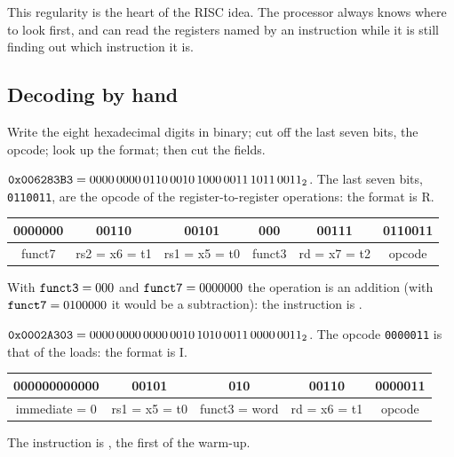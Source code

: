 This regularity is the heart of the RISC idea. The processor always knows
where to look first, and can read the registers named by an instruction while
it is still finding out which instruction it is.

\subsection{Decoding by hand}

\begin{prgconcept}
Write the eight hexadecimal digits in binary; cut off the last seven bits, the
opcode; look up the format; then cut the fields.
\end{prgconcept}

\begin{example}{}
$\texttt{0x006283B3}=0000\,0000\,0110\,0010\,1000\,0011\,1011\,0011_2$. The last
seven bits, \texttt{0110011}, are the opcode of the register-to-register
operations: the format is R.
\begin{center}\small\ttfamily
\begin{tabular}{|c|c|c|c|c|c|}\hline
0000000&00110&00101&000&00111&0110011\\\hline
\multicolumn{1}{c}{\textrm{\scriptsize funct7}}&\multicolumn{1}{c}{\textrm{\scriptsize rs2 = x6 = t1}}&\multicolumn{1}{c}{\textrm{\scriptsize rs1 = x5 = t0}}&\multicolumn{1}{c}{\textrm{\scriptsize funct3}}&\multicolumn{1}{c}{\textrm{\scriptsize rd = x7 = t2}}&\multicolumn{1}{c}{\textrm{\scriptsize opcode}}
\end{tabular}
\end{center}
With $\texttt{funct3}=000$ and $\texttt{funct7}=0000000$ the operation is an
addition (with $\texttt{funct7}=0100000$ it would be a subtraction): the
instruction is .
\end{example}

\begin{example}{}
$\texttt{0x0002A303}=0000\,0000\,0000\,0010\,1010\,0011\,0000\,0011_2$. The opcode
\texttt{0000011} is that of the loads: the format is I.
\begin{center}\small\ttfamily
\begin{tabular}{|c|c|c|c|c|}\hline
000000000000&00101&010&00110&0000011\\\hline
\multicolumn{1}{c}{\textrm{\scriptsize immediate = 0}}&\multicolumn{1}{c}{\textrm{\scriptsize rs1 = x5 = t0}}&\multicolumn{1}{c}{\textrm{\scriptsize funct3 = word}}&\multicolumn{1}{c}{\textrm{\scriptsize rd = x6 = t1}}&\multicolumn{1}{c}{\textrm{\scriptsize opcode}}
\end{tabular}
\end{center}
The instruction is , the first of the warm-up.
\end{example}

